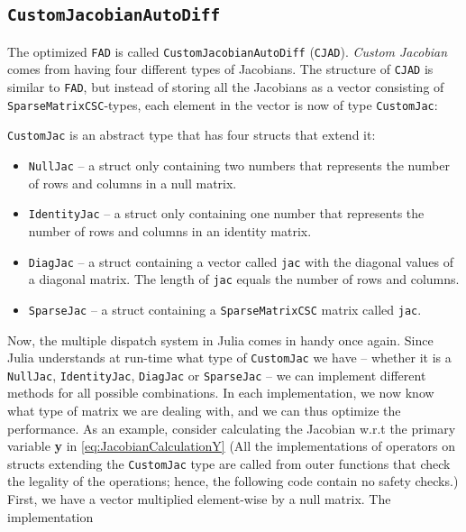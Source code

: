 \subsection{\texttt{CustomJacobianAutoDiff}}
The optimized \texttt{FAD} is called \texttt{CustomJacobianAutoDiff} (\texttt{CJAD}). \textit{Custom Jacobian} comes from having four different types of Jacobians. The structure of \texttt{CJAD} is similar to \texttt{FAD}, but instead of storing all the Jacobians as a vector consisting of \texttt{SparseMatrixCSC}-types, each element in the vector is now of type \texttt{CustomJac}:

\texttt{CustomJac} is an abstract type that has four structs that extend it:
\begin{itemize}
    \item \texttt{NullJac} -- a struct only containing two numbers that represents the number of rows and columns in a null matrix.
    \item \texttt{IdentityJac} -- a struct only containing one number that represents the number of rows and columns in an identity matrix.
    \item \texttt{DiagJac} -- a struct containing a vector called \texttt{jac} with the diagonal values of a diagonal matrix. The length of \texttt{jac} equals the number of rows and columns.
    \item \texttt{SparseJac} -- a struct containing a \texttt{SparseMatrixCSC} matrix called \texttt{jac}.
\end{itemize}
Now, the multiple dispatch system in Julia comes in handy once again. Since Julia understands at run-time what type of \texttt{CustomJac} we have -- whether it is a \texttt{NullJac}, \texttt{IdentityJac}, \texttt{DiagJac} or \texttt{SparseJac} -- we can implement different methods for all possible combinations. In each implementation, we now know what type of matrix we are dealing with, and we can thus optimize the performance. As an example, consider calculating the Jacobian w.r.t the primary variable \textbf{y} in \eqref{eq:JacobianCalculationY} (All the implementations of operators on structs extending the \texttt{CustomJac} type are called from outer functions that check the legality of the operations; hence, the following code contain no safety checks.) First, we have a vector multiplied element-wise by a null matrix. The implementation

